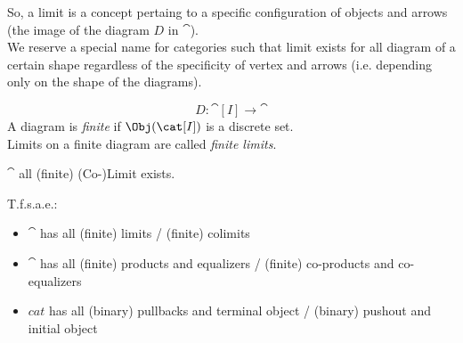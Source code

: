 \documentclass[preview]{standalone}
\begin{document}
So, a limit is a concept pertaing to a specific configuration of objects and arrows (the image of the diagram $D$ in $\cat$).
\\
We reserve a special name for categories such that limit exists for all diagram of a certain shape regardless of the specificity of vertex and arrows (i.e. depending only on the shape of the diagrams).
%
\begin{notation}
	\begin{displaymath}
		D: \cat[I] \rightarrow	\cat
	\end{displaymath}
	A diagram is \emph{finite} if $\Obj(\cat[I])$ is a discrete set.
	\\
	Limits on a finite diagram are called \emph{finite limits}.
\end{notation}
%
\begin{definition}
	$\cat$ \St all (finite) (Co-)Limit exists.
\end{definition}
%
\begin{proposition}
T.f.s.a.e.:
\begin{itemize}
	\item $\cat$ has all (finite) limits / (finite) colimits
	\item $\cat$ has all (finite) products and equalizers / (finite) co-products and co-equalizers
	\item $cat$ has all (binary) pullbacks and terminal object / (binary) pushout and initial object
\end{itemize}

\end{proposition}
\end{document}
